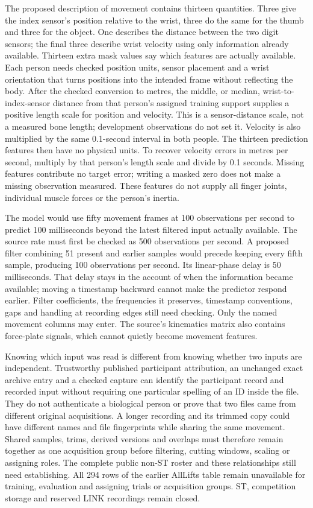 The proposed description of movement contains thirteen quantities. Three give the index sensor's position relative to the wrist, three do the same for the thumb and three for the object. One describes the distance between the two digit sensors; the final three describe wrist velocity using only information already available. Thirteen extra mask values say which features are actually available. Each person needs checked position units, sensor placement and a wrist orientation that turns positions into the intended frame without reflecting the body. After the checked conversion to metres, the middle, or median, wrist-to-index-sensor distance from that person's assigned training support supplies a positive length scale for position and velocity. This is a sensor-distance scale, not a measured bone length; development observations do not set it. Velocity is also multiplied by the same 0.1-second interval in both people. The thirteen prediction features then have no physical units. To recover velocity errors in metres per second, multiply by that person's length scale and divide by 0.1 seconds. Missing features contribute no target error; writing a masked zero does not make a missing observation measured. These features do not supply all finger joints, individual muscle forces or the person's inertia.

The model would use fifty movement frames at 100 observations per second to predict 100 milliseconds beyond the latest filtered input actually available. The source rate must first be checked as 500 observations per second. A proposed filter combining 51 present and earlier samples would precede keeping every fifth sample, producing 100 observations per second. Its linear-phase delay is 50 milliseconds. That delay stays in the account of when the information became available; moving a timestamp backward cannot make the predictor respond earlier. Filter coefficients, the frequencies it preserves, timestamp conventions, gaps and handling at recording edges still need checking. Only the named movement columns may enter. The source's kinematics matrix also contains force-plate signals, which cannot quietly become movement features.

Knowing which input was read is different from knowing whether two inputs are independent. Trustworthy published participant attribution, an unchanged exact archive entry and a checked capture can identify the participant record and recorded input without requiring one particular spelling of an ID inside the file. They do not authenticate a biological person or prove that two files came from different original acquisitions. A longer recording and its trimmed copy could have different names and file fingerprints while sharing the same movement. Shared samples, trims, derived versions and overlaps must therefore remain together as one acquisition group before filtering, cutting windows, scaling or assigning roles. The complete public non-ST roster and these relationships still need establishing. All 294 rows of the earlier AllLifts table remain unavailable for training, evaluation and assigning trials or acquisition groups. ST, competition storage and reserved LINK recordings remain closed.

